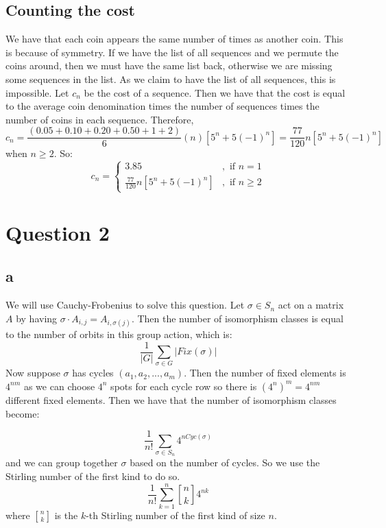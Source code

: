 \documentclass[]{article}
\theoremstyle{definition}
\numberwithin{theorem}{section}
\numberwithin{equation}{section}
\newcommand{\genstirlingI}[3]{%
	\genfrac{[}{]}{0pt}{#1}{#2}{#3}%
}
\newcommand{\stirlingI}[2]{\genstirlingI{}{#1}{#2}}
\begin{document}
\subsection{Counting the cost}
We have that each coin appears the same number of times as another coin. This is because of symmetry. If we have the list of all sequences and we permute the coins around, then we must have the same list back, otherwise we are missing some sequences in the list. As we claim to have the list of all sequences, this is impossible. Let $c_n$ be the cost of a sequence. Then we have that the cost is equal to the average coin denomination times the number of sequences times the number of coins in each sequence. Therefore,
\begin{equation}
	c_n = \frac{(0.05 + 0.10 + 0.20 + 0.50 + 1 + 2) }{6}(n) \left[5^n + 5(-1)^n \right] =  \frac{77}{120} n \left[5^n + 5(-1)^n \right]
\end{equation}
when $n \geq 2$.
So:
\begin{equation}
	c_n = 
	\begin{cases}
		3.85 &, \text{ if } n = 1\\
		\frac{77}{120} n \left[5^n + 5(-1)^n \right] &, \text{ if } n \geq 2
	\end{cases}
\end{equation}

\section{Question 2}

\subsection{a}
We will use Cauchy-Frobenius to solve this question. Let $\sigma \in S_n $ act on a matrix $A$ by having $\sigma \cdot A_{i, j} = A_{i, \sigma(j)}$. Then the number of isomorphism classes is equal to the number of orbits in this group action, which is:
\begin{equation}
	\frac{1}{|G|} \sum_{\sigma \in G} |Fix(\sigma)|
\end{equation}
Now suppose $\sigma$ has cycles $(a_1, a_2, ..., a_m)$. Then the number of fixed elements is $4^{n m}$ as we can choose $4^n$ spots for each cycle row so there is $(4^n)^m = 4^{n m}$ different fixed elements. Then we have that the number of isomorphism classes become:

\begin{equation}
	\frac{1}{n!} \sum_{\sigma \in S_n} 4^{n Cyc(\sigma)}
\end{equation}
and we can group together $\sigma$ based on the number of cycles. So we use the Stirling number of the first kind to do so.
\begin{equation}
	\frac{1}{n!} \sum_{k = 1}^n \stirlingI{n}{k} 4^{n k}
\end{equation}
where $\stirlingI{n}{k}$ is the $k$-th Stirling number of the first kind of size $n$. 
\end{document}
